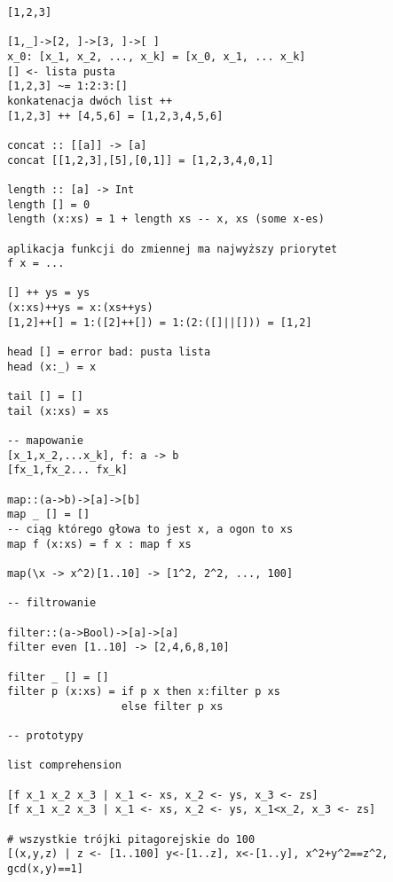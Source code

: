 \documentclass{article}
\begin{document}
\begin{verbatim}
[1,2,3]

[1,_]->[2, ]->[3, ]->[ ]
x_0: [x_1, x_2, ..., x_k] = [x_0, x_1, ... x_k]
[] <- lista pusta
[1,2,3] ~= 1:2:3:[]
konkatenacja dwóch list ++
[1,2,3] ++ [4,5,6] = [1,2,3,4,5,6]

concat :: [[a]] -> [a]
concat [[1,2,3],[5],[0,1]] = [1,2,3,4,0,1]

length :: [a] -> Int
length [] = 0
length (x:xs) = 1 + length xs -- x, xs (some x-es)

aplikacja funkcji do zmiennej ma najwyższy priorytet
f x = ...

[] ++ ys = ys
(x:xs)++ys = x:(xs++ys)
[1,2]++[] = 1:([2]++[]) = 1:(2:([]||[])) = [1,2]

head [] = error bad: pusta lista
head (x:_) = x

tail [] = []
tail (x:xs) = xs

-- mapowanie
[x_1,x_2,...x_k], f: a -> b
[fx_1,fx_2... fx_k]

map::(a->b)->[a]->[b]
map _ [] = []
-- ciąg którego głowa to jest x, a ogon to xs
map f (x:xs) = f x : map f xs

map(\x -> x^2)[1..10] -> [1^2, 2^2, ..., 100]

-- filtrowanie

filter::(a->Bool)->[a]->[a]
filter even [1..10] -> [2,4,6,8,10]

filter _ [] = []
filter p (x:xs) = if p x then x:filter p xs
                  else filter p xs

-- prototypy

list comprehension

[f x_1 x_2 x_3 | x_1 <- xs, x_2 <- ys, x_3 <- zs]
[f x_1 x_2 x_3 | x_1 <- xs, x_2 <- ys, x_1<x_2, x_3 <- zs]

# wszystkie trójki pitagorejskie do 100
[(x,y,z) | z <- [1..100] y<-[1..z], x<-[1..y], x^2+y^2==z^2, gcd(x,y)==1]

\end{verbatim}
\end{document}
